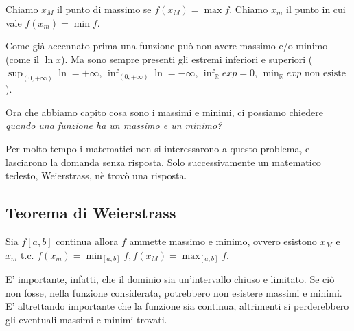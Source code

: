 Chiamo $x_M$ il punto di massimo se $f(x_M)=\max{f}$. Chiamo $x_m$ il punto in cui vale $f(x_m)=\min{f}$.
\begin{osservation}
    Come già accennato prima una funzione può non avere massimo e/o minimo (come il $\ln{x}$).
    Ma sono sempre presenti gli estremi inferiori e superiori ($\sup_{(0,+\infty)}\ln=+\infty$, $\inf_{(0,+\infty)}\ln=-\infty$, $\inf_\mathbb{R}exp=0$, $\min_\mathbb{R}exp\text{ non esiste}$).
\end{osservation}

Ora che abbiamo capito cosa sono i massimi e minimi, ci possiamo chiedere \textit{quando una funzione ha un massimo e un minimo?}

Per molto tempo i matematici non si interessarono a questo problema, e lasciarono la domanda senza risposta. Solo successivamente un matematico tedesto, Weierstrass, nè trovò una risposta.

\subsection{Teorema di Weierstrass}
Sia $f[a,b]$ continua allora $f$ ammette massimo e minimo, ovvero esistono $x_M$ e $x_m$ t.c. $f(x_m)=\min_{[a,b]}f, f(x_M)=\max_{[a,b]}f$.

E' importante, infatti, che il dominio sia un'intervallo chiuso e limitato. Se ciò non fosse, nella funzione considerata, potrebbero non esistere massimi e minimi. E' altrettando importante che la funzione sia continua, altrimenti si perderebbero gli eventuali massimi e minimi trovati.

